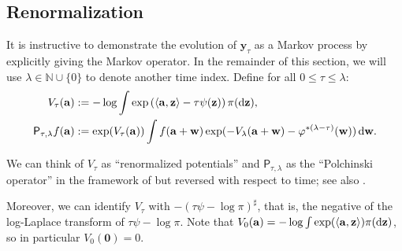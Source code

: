 \documentclass[11pt]{article}
\newcommand{\inprod}[2]{\left\langle#1, #2\right\rangle}
\newcommand{\N}{\mathbb{N}}
\newcommand{\dd}{\textup{d}}
\newcommand{\Par}[1]{\left(#1\right)}
\newcommand{\0}{\mathbf{0}}
\newcommand{\1}{\mathbf{1}}
\newcommand{\va}{\mathbf{a}}
\newcommand{\vw}{\mathbf{w}}
\newcommand{\vy}{\mathbf{y}}
\newcommand{\vz}{\mathbf{z}}
\newcommand{\sfP}{\mathsf{P}}
\begin{document}
\subsection{Renormalization} \label{ssec:renorm}
It is instructive to demonstrate the evolution of $\vy_\tau$ as a Markov process by explicitly giving the Markov operator. In the remainder of this section, we will use $\lambda\in \N\cup \{0\}$ to denote another time index. Define for all $0 \le \tau \le \lambda$:
\begin{equation}
    \begin{aligned}
        V_\tau(\va) &:= -\log \int \exp\Par{\inprod{\va}{\vz}-\tau\psi(\vz)}\pi(\dd\vz),\\
        \sfP_{\tau, \lambda}f(\va)&:=\exp(V_{\tau}(\va))\int f(\va+\vw)\exp(-V_{\lambda}(\va+\vw)-\varphi^{*(\lambda-\tau)}(\vw))\,\dd\vw.
    \end{aligned}
\end{equation}

We can think of $V_\tau$ as ``renormalized potentials'' and $\sfP_{\tau, \lambda}$ as the ``Polchinski operator'' in the framework of \cite{BauerschmidtBD24} but reversed with respect to time; see also \cite{ShiTZ25}. 

Moreover, we can identify $V_\tau$ with $-(\tau\psi-\log \pi)^{\sharp}$, that is, the negative of the log-Laplace transform of $\tau\psi-\log \pi$.  Note that $V_0(\va)=-\log \int \exp(\inprod{\va}{\vz})\pi(\dd\vz)$, so in particular $V_0(\mathbf{0})=0$. 
\end{document}
